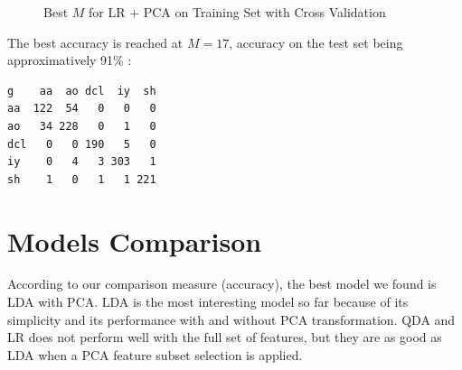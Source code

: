 \documentclass[]{report}
\newcommand{\inputtikz}[2]{%
	\scalebox{#1}{}  
}
\begin{document}
\begin{figure}[!hb]
	\centering
	\inputtikz{0.5}{Figures/lr_pca_cv.tex}
	\caption{Best $M$ for LR + PCA on Training Set with Cross Validation}
	\label{fig:lr_pca_cv}
\end{figure}

The best accuracy is reached at $M = 17$, accuracy on the test set being approximatively 91\% : 
\begin{verbatim}
g    aa  ao dcl  iy  sh
aa  122  54   0   0   0
ao   34 228   0   1   0
dcl   0   0 190   5   0
iy    0   4   3 303   1
sh    1   0   1   1 221
\end{verbatim}

\section{Models Comparison}

According to our comparison measure (accuracy), the best model we found is LDA with PCA. LDA is the most interesting model so far because of its simplicity and its performance with and without PCA transformation. QDA and LR does not perform well with the full set of features, but they are as good as LDA when a PCA feature subset selection is applied.  
\end{document}
